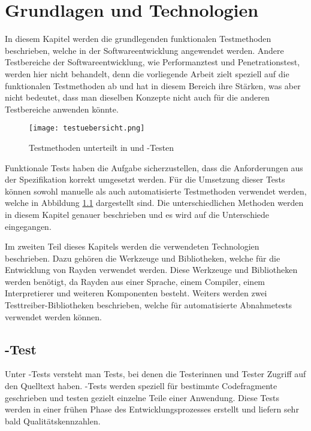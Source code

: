 \chapter{Grundlagen und Technologien}
\label{cha:StandDerTechnik}

In diesem Kapitel werden die grundlegenden funktionalen Testmethoden beschrieben, welche in der Softwareentwicklung angewendet werden. Andere Testbereiche der Softwareentwicklung, wie Performanztest und Penetrationstest, werden hier nicht behandelt, denn die vorliegende Arbeit zielt speziell auf die funktionalen Testmethoden ab und hat in diesem Bereich ihre Stärken, was aber nicht bedeutet, dass man dieselben Konzepte nicht auch für die anderen Testbereiche anwenden könnte. 


\begin{figure}
\centering
\texttt{[image: testuebersicht.png]}
\caption{Testmethoden unterteilt in  und -Testen}
\label{fig:testtypen}
\end{figure}

\SuperPar
Funktionale Tests haben die Aufgabe sicherzustellen, dass die Anforderungen aus der Spezifikation korrekt umgesetzt werden. Für die Umsetzung dieser Tests können sowohl manuelle als auch automatisierte Testmethoden verwendet werden, welche in Abbildung \ref{fig:testtypen} dargestellt sind. Die unterschiedlichen Methoden werden in diesem Kapitel genauer beschrieben und es wird auf die Unterschiede eingegangen.

\SuperPar
Im zweiten Teil dieses Kapitels werden die verwendeten Technologien beschrieben. Dazu gehören die Werkzeuge und Bibliotheken, welche für die Entwicklung von Rayden verwendet werden. Diese Werkzeuge und Bibliotheken werden benötigt, da Rayden aus einer Sprache, einem Compiler, einem Interpretierer und weiteren Komponenten besteht. Weiters werden zwei Testtreiber-Bibliotheken beschrieben, welche für automatisierte Abnahmetests verwendet werden können. 

\section{-Test}

Unter -Tests versteht man Tests, bei denen die Testerinnen und Tester Zugriff auf den Quelltext haben. -Tests werden speziell für bestimmte Codefragmente geschrieben und testen gezielt einzelne Teile einer Anwendung. Diese Tests werden in einer frühen Phase des Entwicklungsprozesses erstellt und liefern sehr bald Qualitätskennzahlen. 

